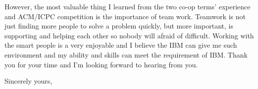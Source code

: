 \documentclass{letter} %
\begin{document}
\begin{letter}{}
\noindent However, the most valuable thing I learned from the two co-op terms' experience and ACM/ICPC competition is the importance of team work. Teamwork is not just finding more people to solve a problem quickly, but more important, is supporting and helping each other so nobody will afraid of difficult.  Working with the smart people is a very enjoyable and I believe the IBM can give me such environment and my ability and skills can meet the requirement of IBM. Thank you for your time and I'm looking forward to hearing from you. 

\closing{Sincerely yours,} 
 

 

\end{letter}
 
\end{document}
